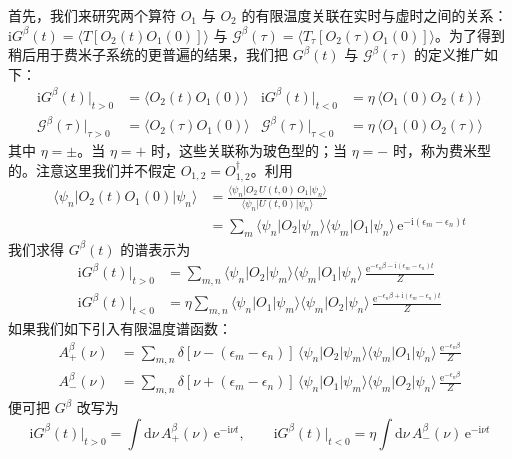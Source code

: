 首先，我们来研究两个算符 $O_1$ 与 $O_2$ 的有限温度关联在实时与虚时之间的关系：$\mathrm{i}G^{\beta}(t) = \langle T[O_2(t)O_1(0)]\rangle$ 与 $\mathcal{G}^{\beta}(\tau) = \langle T_{\tau}[O_2(\tau)O_1(0)]\rangle$。为了得到稍后用于费米子系统的更普遍的结果，我们把 $G^{\beta}(t)$ 与 $\mathcal{G}^{\beta}(\tau)$ 的定义推广如下：
\begin{align*}
\mathrm{i}G^{\beta}(t)\bigr|_{t>0} &= \langle O_2(t)O_1(0)\rangle
& \mathrm{i}G^{\beta}(t)\bigr|_{t<0} &= \eta\,\langle O_1(0)O_2(t)\rangle
\\
\mathcal{G}^{\beta}(\tau)\bigr|_{\tau>0} &= \langle O_2(\tau)O_1(0)\rangle
& \mathcal{G}^{\beta}(\tau)\bigr|_{\tau<0} &= \eta\,\langle O_1(0)O_2(\tau)\rangle
\end{align*}
其中 $\eta = \pm$。当 $\eta = +$ 时，这些关联称为玻色型的；当 $\eta = -$ 时，称为费米型的。注意这里我们并不假定 $O_{1,2} = O^{\dagger}_{1,2}$。利用
\begin{align*}
\langle\psi_n|O_2(t)O_1(0)|\psi_n\rangle &= \frac{\langle\psi_n|O_2\, U(t,0)\, O_1|\psi_n\rangle}{\langle\psi_n|U(t,0)|\psi_n\rangle}
\\
&= \sum_m \langle\psi_n|O_2|\psi_m\rangle\langle\psi_m|O_1|\psi_n\rangle\, \mathrm{e}^{-\mathrm{i}(\epsilon_m - \epsilon_n)t}
\end{align*}
我们求得 $G^{\beta}(t)$ 的谱表示为
\begin{align*}
\mathrm{i}G^{\beta}(t)\bigr|_{t>0} &= \sum_{m,n} \langle\psi_n|O_2|\psi_m\rangle\langle\psi_m|O_1|\psi_n\rangle\, \frac{\mathrm{e}^{-\epsilon_n\beta - \mathrm{i}(\epsilon_m - \epsilon_n)t}}{Z}
\\
\mathrm{i}G^{\beta}(t)\bigr|_{t<0} &= \eta \sum_{m,n} \langle\psi_n|O_1|\psi_m\rangle\langle\psi_m|O_2|\psi_n\rangle\, \frac{\mathrm{e}^{-\epsilon_n\beta + \mathrm{i}(\epsilon_m - \epsilon_n)t}}{Z} \tag{2.2.24}
\end{align*}
如果我们如下引入有限温度谱函数：
\begin{align*}
A^{\beta}_{+}(\nu) &= \sum_{m,n} \delta[\nu - (\epsilon_m - \epsilon_n)]\, \langle\psi_n|O_2|\psi_m\rangle\langle\psi_m|O_1|\psi_n\rangle\, \frac{\mathrm{e}^{-\epsilon_n\beta}}{Z}
\\
A^{\beta}_{-}(\nu) &= \sum_{m,n} \delta[\nu + (\epsilon_m - \epsilon_n)]\, \langle\psi_n|O_1|\psi_m\rangle\langle\psi_m|O_2|\psi_n\rangle\, \frac{\mathrm{e}^{-\epsilon_n\beta}}{Z}
\end{align*}
便可把 $G^{\beta}$ 改写为
\begin{equation*}
\mathrm{i}G^{\beta}(t)\bigr|_{t>0} = \int \mathrm{d}\nu\, A^{\beta}_{+}(\nu)\,\mathrm{e}^{-\mathrm{i}\nu t}, \qquad \mathrm{i}G^{\beta}(t)\bigr|_{t<0} = \eta \int \mathrm{d}\nu\, A^{\beta}_{-}(\nu)\,\mathrm{e}^{-\mathrm{i}\nu t} \tag{2.2.25}
\end{equation*}

